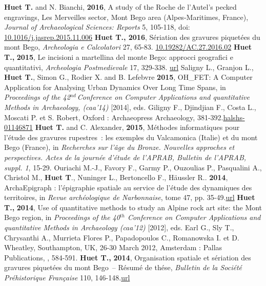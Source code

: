 \documentclass{article}
\begin{document}
\smallbreak
\textbf{Huet T.} and N. Bianchi, \textbf{2016}, A study of the Roche de l'Autel's pecked engravings, Les Merveilles sector, Mont Bego area (Alpes-Maritimes, France), \textit{Journal of Archaeological Sciences: Reports} 5, 105-118, doi: \href{https://doi.org/10.1016/j.jasrep.2015.11.006}{10.1016/j.jasrep.2015.11.006}
\smallbreak
\textbf{Huet T., 2016}, S\'{e}riation des gravures piquet\'{e}es du mont Bego, \textit{Archeologia e Calcolatori} 27, 65-83. \href{https://doi.org/10.19282/AC.27.2016.02}{10.19282/AC.27.2016.02}
\smallbreak
\textbf{Huet T.,} \textbf{2015}, Le incisioni a martellina del monte Bego: approcci geografici e quantitativi, \textit{Archeologia Postmedievale} 17, 329-338. \href{https://www.insegnadelgiglio.it/wp-content/uploads/2015/01/APM_17_libro-anteprima.pdf}{url}
\smallbreak
Saligny L., Granjon L., \textbf{Huet T.}, Simon G., Rodier X. and B. Lefebvre \textbf{2015}, OH\_FET: A Computer Application for Analysing Urban Dynamics Over Long Time Spans, in\textit{ Proceedings of the 42${}^{nd\ }$Conference on Computer Applications and quantitative Methods in Archaeology, (caa'14) }[2014], eds\textit{. }Giligny F., Djindjian F., Costa L., Moscati P. et S. Robert, Oxford : Archaeopress Archaeology, 381-392.\href{https://hal.archives-ouvertes.fr/halshs-01146871}{halshs-01146871}
\smallbreak
\textbf{Huet T.} and C. Alexander, \textbf{2015}, M\'{e}thodes informatiques pour l'\'{e}tude des gravures rupestres~: les exemples du Valcamonica (Italie) et du mont Bego (France), in \textit{Recherches sur l'\^{a}ge du Bronze. Nouvelles approches et perspectives. Actes de la journ\'{e}e d'\'{e}tude de l'APRAB, Bulletin de l'APRAB, suppl. 1}, 15-29.
\smallbreak
Ouriachi M.-J., Favory F., Garmy P., Ouzoulias P., Pasqualini A., Christol M., \textbf{Huet T}., Nuninger L., Bertoncello F., H\"{a}ussler R.. \textbf{2014}, ArchaEpigraph : l'\'{e}pigraphie spatiale au service de l'\'{e}tude des dynamiques des territoires, in \textit{Revue arch\'{e}ologique de Narbonnaise}, tome 47, pp. 35-49.\href{https://www.persee.fr/doc/ran_0557-7705_2014_num_47_1_1897}{url}
\smallbreak
\textbf{Huet T.,} \textbf{2014}, Use of quantitative methods to study an Alpine rock art site: the Mont Bego region, in \textit{Proceedings of the 40${}^{th}$ Conference on Computer Applications and quantitative Methods in Archaeology (caa'12) }[2012], eds. Earl G., Sly T., Chrysanthi A., Murrieta Flores P., Papadopoulos C., Romanowska I. et D. Wheatley, Southampton, UK, 26-30 March 2012, Amsterdam : Pallas Publications, , 584-591.
\smallbreak
\textbf{Huet T.,} \textbf{2014}, Organisation spatiale et s\'{e}riation des gravures piquet\'{e}es du mont Bego~-- R\'{e}sum\'{e} de th\'{e}se, \textit{Bulletin de la Soci\'{e}t\'{e} Pr\'{e}historique Fran\c{c}aise} 110, 146-148.\href{https://www.persee.fr/doc/bspf_0249-7638_2013_num_110_1_14242}{url}
\end{document}
